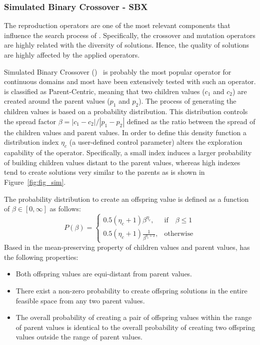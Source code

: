 \subsubsection{Simulated Binary Crossover - SBX}

The reproduction operators are one of the most relevant components that influence the search process of \EAS{}.
%
Specifically, the crossover and mutation operators are highly related with the diversity of solutions.
%
Hence, the quality of solutions are highly affected by the applied operators.
%

Simulated Binary Crossover (\SBX{})~\cite{deb1994simulated} is probably the most popular operator for continuous domains and most \MOEAS{} have been extensively
tested with such an operator\cite{Joel:NSGAII,Joel:SMSEMOA}.
%
\SBX{} is classified as Parent-Centric, meaning that two children values ($c_1$ and $c_2$) are created around the parent values ($p_1$ and $p_2$).
%
The process of generating the children values is based on a probability distribution.
%
This distribution controls the spread factor $\beta = |c_1 - c_2 | / |p_1 - p_2|$ defined as the ratio between the spread of the children values and parent values.
%
In order to define this density function a distribution index $\eta_c$ (a user-defined control parameter) alters the exploration capability of the operator.
%
Specifically, a small index induces a larger probability of building children values distant to the parent values, 
whereas high indexes tend to create solutions very similar to the parents as is shown in Figure~\ref{fig:fig_sim}.
%

%
The probability distribution to create an offspring value is defined as a function of $\beta \in [0, \infty]$ as follows:
%
\begin{equation}
    P(\beta)= 
\begin{cases}
     0.5(\eta_c + 1)\beta^{\eta_c},& \text{if} \quad \beta \leq 1\\
     0.5(\eta_c + 1) \frac{1}{\beta^{\eta_c + 2}} ,& \text{otherwise}
\end{cases}
\end{equation}
%
Based in the mean-preserving property of children values and parent values, \SBX{} has the following properties:
\begin{itemize}
\item Both offspring values are equi-distant from parent values.
\item There exist a non-zero probability to create offspring solutions in the entire feasible space from any two parent values.
\item The overall probability of creating a pair of offspring values within the range of parent values is identical to the overall probability of creating two offspring values outside  
the range of parent values.
\end{itemize}





